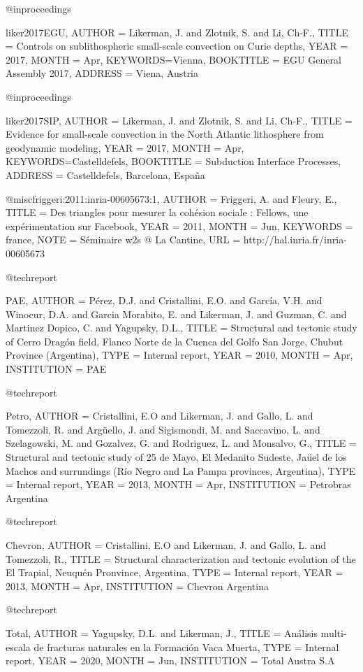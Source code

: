 @inproceedings{liker2017EGU,
  AUTHOR = {Likerman, J. and Zlotnik, S. and Li, Ch-F.},
  TITLE = {{Controls on sublithospheric small-scale convection on Curie depths}},
  YEAR = {2017},
  MONTH = Apr,
  KEYWORDS={Vienna},
  BOOKTITLE = {{EGU General Assembly 2017}},
  ADDRESS = {Viena, Austria}

}

@inproceedings{liker2017SIP,
  AUTHOR = {Likerman, J. and Zlotnik, S. and Li, Ch-F.},
  TITLE = {{Evidence for small-scale convection in the North Atlantic lithosphere from geodynamic modeling}},
  YEAR = {2017},
  MONTH = Apr,
  KEYWORDS={Castelldefels},
  BOOKTITLE = {{Subduction Interface Processes}},
  ADDRESS = {Castelldefels, Barcelona, España}

}

@misc{friggeri:2011:inria-00605673:1,
  AUTHOR = {Friggeri, A. and Fleury, E.},
  TITLE = {{Des triangles pour mesurer la coh{\'e}sion sociale : Fellows, une exp{\'e}rimentation sur Facebook}},
  YEAR = {2011},
  MONTH = Jun,
  KEYWORDS = {france},
  NOTE = {S{\'e}minaire w2s @ La Cantine},
  URL = {http://hal.inria.fr/inria-00605673}
}

@techreport{PAE,
  AUTHOR = {Pérez, D.J. and Cristallini, E.O. and García, V.H. and Winocur, D.A. and Garcia Morabito, E. and Likerman, J. and Guzman, C. and Martinez Dopico, C. and Yagupsky, D.L.},
  TITLE = {{Structural and tectonic study of Cerro Dragón field, Flanco Norte de la Cuenca del Golfo San Jorge, Chubut Province (Argentina)}},
  TYPE = {Internal report},
  YEAR = {2010},
  MONTH = Apr,
  INSTITUTION = {PAE}

}

@techreport{Petro,
  AUTHOR = {Cristallini, E.O and Likerman, J. and Gallo, L. and Tomezzoli, R. and Argüello, J. and Sigismondi, M. and Saccavino, L. and Szelagowski, M. and Gozalvez, G. and Rodriguez, L. and Monsalvo, G.},
  TITLE = {{Structural and tectonic study of 25 de Mayo, El Medanito Sudeste, Jaüel de los Machos and surrundings (Río Negro and La Pampa provinces, Argentina)}},
  TYPE = {Internal report},
  YEAR = {2013},
  MONTH = Apr,
  INSTITUTION = {Petrobras Argentina}

}

@techreport{Chevron,
  AUTHOR = {Cristallini, E.O and Likerman, J. and Gallo, L. and Tomezzoli, R.},
  TITLE = {{Structural characterization and tectonic evolution of the El Trapial, Neuquén Pronvince, Argentina}},
  TYPE = {Internal report},
  YEAR = {2013},
  MONTH = Apr,
  INSTITUTION = {Chevron Argentina}

}

@techreport{Total,
  AUTHOR = {Yagupsky, D.L. and Likerman, J.},
  TITLE = {{Análisis multi-escala de fracturas naturales en la Formación Vaca Muerta}},
  TYPE = {Internal report},
  YEAR = {2020},
  MONTH = Jun,
  INSTITUTION = {Total Austra S.A}
  
}
